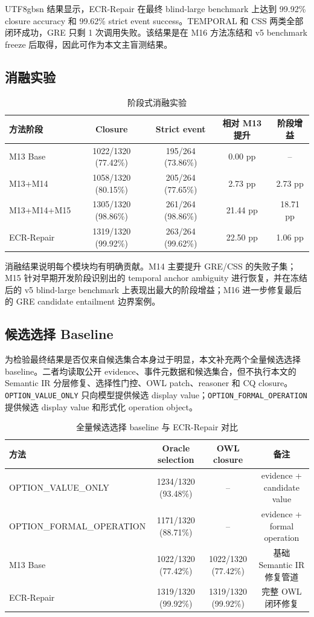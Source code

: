 \documentclass[11pt]{article}
\begin{document}
\begin{CJK*}{UTF8}{gbsn}
结果显示，ECR-Repair 在最终 blind-large benchmark 上达到 99.92\% closure accuracy 和 99.62\% strict event success。TEMPORAL 和 CSS 两类全部闭环成功，GRE 只剩 1 次调用失败。该结果是在 M16 方法冻结和 v5 benchmark freeze 后取得，因此可作为本文主盲测结果。

\subsection{消融实验}

\begin{table}[t]
\centering
\caption{阶段式消融实验}
\label{tab:ablation}
\begin{tabular}{lcccc}
\toprule
方法阶段 & Closure & Strict event & 相对 M13 提升 & 阶段增益 \\
\midrule
M13 Base & 1022/1320 (77.42\%) & 195/264 (73.86\%) & 0.00 pp & -- \\
M13+M14 & 1058/1320 (80.15\%) & 205/264 (77.65\%) & 2.73 pp & 2.73 pp \\
M13+M14+M15 & 1305/1320 (98.86\%) & 261/264 (98.86\%) & 21.44 pp & 18.71 pp \\
ECR-Repair & 1319/1320 (99.92\%) & 263/264 (99.62\%) & 22.50 pp & 1.06 pp \\
\bottomrule
\end{tabular}
\end{table}

消融结果说明每个模块均有明确贡献。M14 主要提升 GRE/CSS 的失败子集；M15 针对早期开发阶段识别出的 temporal anchor ambiguity 进行恢复，并在冻结后的 v5 blind-large benchmark 上表现出最大的阶段增益；M16 进一步修复最后的 GRE candidate entailment 边界案例。

\subsection{候选选择 Baseline}

为检验最终结果是否仅来自候选集合本身过于明显，本文补充两个全量候选选择 baseline。二者均读取公开 evidence、事件元数据和候选集合，但不执行本文的 Semantic IR 分层修复、选择性门控、OWL patch、reasoner 和 CQ closure。\texttt{OPTION\_VALUE\_ONLY} 只向模型提供候选 display value；\texttt{OPTION\_FORMAL\_OPERATION} 提供候选 display value 和形式化 operation object。

\begin{table}[t]
\centering
\caption{全量候选选择 baseline 与 ECR-Repair 对比}
\label{tab:baselines}
\begin{tabular}{lccc}
\toprule
方法 & Oracle selection & OWL closure & 备注 \\
\midrule
OPTION\_VALUE\_ONLY & 1234/1320 (93.48\%) & -- & evidence + candidate value \\
OPTION\_FORMAL\_OPERATION & 1171/1320 (88.71\%) & -- & evidence + formal operation \\
M13 Base & 1022/1320 (77.42\%) & 1022/1320 (77.42\%) & 基础 Semantic IR 修复管道 \\
ECR-Repair & 1319/1320 (99.92\%) & 1319/1320 (99.92\%) & 完整 OWL 闭环修复 \\
\bottomrule
\end{tabular}
\end{table}


\end{CJK*}
\end{document}
